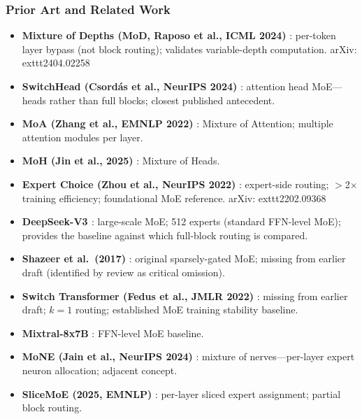 \documentclass[11pt]{article}
\begin{document}
\subsubsection*{Prior Art and Related Work}
\begin{itemize}
  \item \textbf{Mixture of Depths (MoD, Raposo et al., ICML 2024)} \cite{RaposoEtAl2024}: per-token layer bypass (not block routing); validates variable-depth computation.
    arXiv:	exttt{2404.02258}

  \item \textbf{SwitchHead (Csord\'{a}s et al., NeurIPS 2024)} \cite{CsordasEtAl2024}: attention head MoE---heads rather than full blocks; closest published antecedent.

  \item \textbf{MoA (Zhang et al., EMNLP 2022)} \cite{ZhangEtAl2022MoA}: Mixture of Attention; multiple attention modules per layer.

  \item \textbf{MoH (Jin et al., 2025)} \cite{JinEtAl2025MoH}: Mixture of Heads.

  \item \textbf{Expert Choice (Zhou et al., NeurIPS 2022)} \cite{ZhouLepikhinEtAl2022}: expert-side routing; $>$2$\times$ training efficiency; foundational MoE reference.
    arXiv:	exttt{2202.09368}

  \item \textbf{DeepSeek-V3 \cite{DeepSeekAI2024}}: large-scale MoE; 512 experts (standard FFN-level MoE); provides the baseline against which full-block routing is compared.

  \item \textbf{Shazeer et al.\ (2017)} \cite{Shazeer2017}: original sparsely-gated MoE; missing from earlier draft (identified by review as critical omission).

  \item \textbf{Switch Transformer (Fedus et al., JMLR 2022)} \cite{FedusEtAl2022}: missing from earlier draft; $k=1$ routing; established MoE training stability baseline.

  \item \textbf{Mixtral-8x7B} \cite{MistralAI2024}: FFN-level MoE baseline.

  \item \textbf{MoNE (Jain et al., NeurIPS 2024)} \cite{JainEtAl2024}: mixture of nerves---per-layer expert neuron allocation; adjacent concept.

  \item \textbf{SliceMoE (2025, EMNLP)} \cite{SliceMoE2025}: per-layer sliced expert assignment; partial block routing.
\end{itemize}
\end{document}
